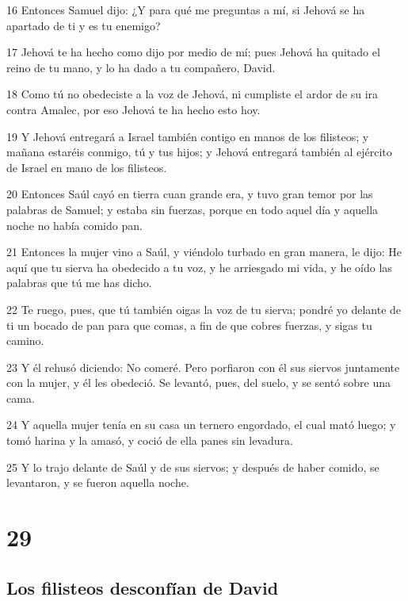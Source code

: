 {\par 16 Entonces Samuel dijo: ¿Y para qué me preguntas a mí, si Jehová se ha apartado de ti y es tu enemigo?
\par 17 Jehová te ha hecho como dijo por medio de mí; pues Jehová ha quitado el reino de tu mano, y lo ha dado a tu compañero, David.
\par 18 Como tú no obedeciste a la voz de Jehová, ni cumpliste el ardor de su ira contra Amalec, por eso Jehová te ha hecho esto hoy. 
\par 19 Y Jehová entregará a Israel también contigo en manos de los filisteos; y mañana estaréis conmigo, tú y tus hijos; y Jehová entregará también al ejército de Israel en mano de los filisteos.
\par 20 Entonces Saúl cayó en tierra cuan grande era, y tuvo gran temor por las palabras de Samuel; y estaba sin fuerzas, porque en todo aquel día y aquella noche no había comido pan.
\par 21 Entonces la mujer vino a Saúl, y viéndolo turbado en gran manera, le dijo: He aquí que tu sierva ha obedecido a tu voz, y he arriesgado mi vida, y he oído las palabras que tú me has dicho.
\par 22 Te ruego, pues, que tú también oigas la voz de tu sierva; pondré yo delante de ti un bocado de pan para que comas, a fin de que cobres fuerzas, y sigas tu camino.
\par 23 Y él rehusó diciendo: No comeré. Pero porfiaron con él sus siervos juntamente con la mujer, y él les obedeció. Se levantó, pues, del suelo, y se sentó sobre una cama.
\par 24 Y aquella mujer tenía en su casa un ternero engordado, el cual mató luego; y tomó harina y la amasó, y coció de ella panes sin levadura. 
\par 25 Y lo trajo delante de Saúl y de sus siervos; y después de haber comido, se levantaron, y se fueron aquella noche.

\chapter{29}

\section*{Los filisteos desconfían de David}

}
